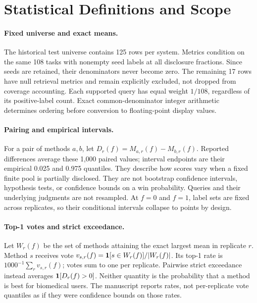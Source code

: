 


\appendix
\section{Statistical Definitions and Scope}
\label{app:stats}
\paragraph{Fixed universe and exact means.}
The historical test universe contains 125 rows per system. Metrics condition on the same 108 tasks with nonempty seed labels at all disclosure fractions. Since seeds are retained, their denominators never become zero. The remaining 17 rows have null retrieval metrics and remain explicitly excluded, not dropped from coverage accounting. Each supported query has equal weight $1/108$, regardless of its positive-label count. Exact common-denominator integer arithmetic determines ordering before conversion to floating-point display values.

\paragraph{Pairing and empirical intervals.}
For a pair of methods $a,b$, let $D_r(f)=M_{a,r}(f)-M_{b,r}(f)$. Reported differences average these 1,000 paired values; interval endpoints are their empirical 0.025 and 0.975 quantiles. They describe how scores vary when a fixed finite pool is partially disclosed. They are not bootstrap confidence intervals, hypothesis tests, or confidence bounds on a win probability. Queries and their underlying judgments are not resampled. At $f=0$ and $f=1$, label sets are fixed across replicates, so their conditional intervals collapse to points by design.

\paragraph{Top-1 votes and strict exceedance.}
Let $W_r(f)$ be the set of methods attaining the exact largest mean in replicate $r$. Method $s$ receives vote $v_{s,r}(f)=\mathbf{1}[s\in W_r(f)]/|W_r(f)|$. Its top-1 rate is $1000^{-1}\sum_r v_{s,r}(f)$; votes sum to one per replicate. Pairwise strict exceedance instead averages $\mathbf{1}[D_r(f)>0]$. Neither quantity is the probability that a method is best for biomedical users. The manuscript reports rates, not per-replicate vote quantiles as if they were confidence bounds on those rates.

